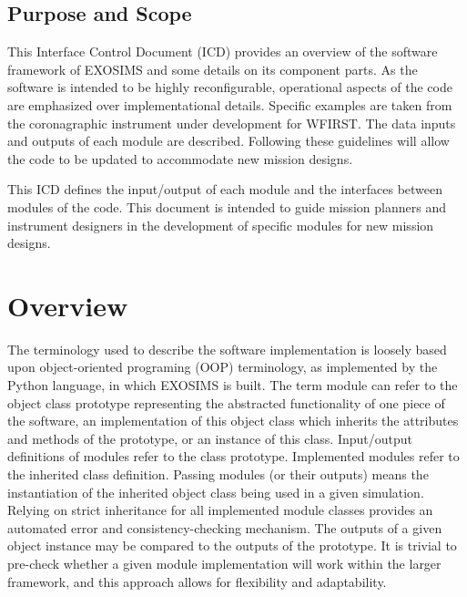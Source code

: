 \documentclass[cleanfoot]{asme2ej}
\begin{document}
\subsection{Purpose and Scope} %
This Interface Control Document (ICD) provides an overview of the software framework of EXOSIMS and some details on its component parts.  As the software is intended to be highly reconfigurable, operational aspects of the code are emphasized over implementational details.  Specific examples are taken from the coronagraphic instrument under development for WFIRST.  The data inputs and outputs of each module are described. Following these guidelines will allow the code to be updated to accommodate new mission designs.

This ICD defines the input/output of each module and the interfaces between modules of the code.  This document is intended to guide mission planners and instrument designers in the development of specific modules for new mission designs.


\section{Overview}
The terminology used to describe the software implementation is loosely based upon object-oriented programing (OOP) terminology, as implemented by the Python language, in which EXOSIMS is built.  The term module can refer to the object class prototype representing the abstracted functionality of one piece of the software, an implementation of this object class which inherits the attributes and methods of the prototype, or an instance of this class.  Input/output definitions of modules refer to the class prototype.  Implemented modules refer to the inherited class definition.  Passing modules (or their outputs) means the instantiation of the inherited object class being used in a given simulation.  Relying on strict inheritance for all implemented module classes provides an automated error and consistency-checking mechanism.  The outputs of a given object instance may be compared to the outputs of the prototype.  It is trivial to pre-check whether a given module implementation will work within the larger framework, and this approach allows for flexibility and adaptability.
\end{document}

